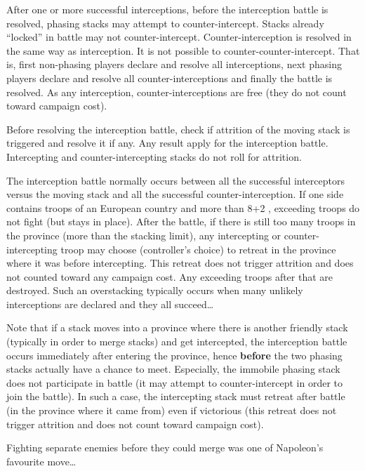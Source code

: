 After one or more successful interceptions, before the interception battle is
resolved, phasing stacks may attempt to counter-intercept. Stacks already
``locked'' in battle may not counter-intercept. Counter-interception is
resolved in the same way as interception. It is not possible to
counter-counter-intercept. That is, first non-phasing players declare and
resolve all interceptions, next phasing players declare and resolve all
counter-interceptions and finally the battle is resolved. As any interception,
counter-interceptions are free (they do not count toward campaign cost).

Before resolving the interception battle, check if attrition of the moving
stack is triggered and resolve it if any. Any  result apply
for the interception battle. Intercepting and counter-intercepting stacks do
not roll for attrition.

The interception battle normally occurs between all the successful
interceptors versus the moving stack and all the successful
counter-interception. If one side contains troops of an European country and
more than 8\LD+2 \Pashas, exceeding troops do not fight (but stays in
place). After the battle, if there is still too many troops in the province
(more than the stacking limit), any intercepting or counter-intercepting troop
may choose (controller's choice) to retreat in the province where it was
before intercepting. This retreat does not trigger attrition and does not
counted toward any campaign cost. Any exceeding troops after that are
destroyed. Such an overstacking typically occurs when many unlikely
interceptions are declared and they all succeed\ldots

Note that if a stack moves into a province where there is another friendly
stack (typically in order to merge stacks) and get intercepted, the
interception battle occurs immediately after entering the province, hence
\textbf{before} the two phasing stacks actually have a chance to
meet. Especially, the immobile phasing stack does not participate in battle
(it may attempt to counter-intercept in order to join the battle). In such a
case, the intercepting stack must retreat after battle (in the province where
it came from) even if victorious (this retreat does not trigger attrition and
does not count toward campaign cost).

\begin{designnote}
  Fighting separate enemies before they could merge was one of Napoleon's
  favourite move\ldots
\end{designnote}

